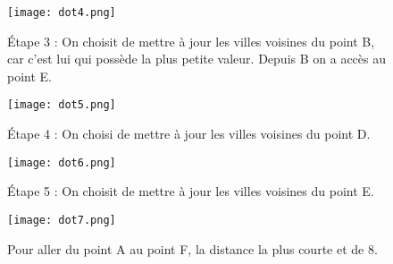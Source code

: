 \begin{figure}[h]
\begin{center}
    \texttt{[image: dot4.png]} 
    \caption{Étape 3 : On choisit de mettre à jour les villes voisines du point B, car c'est lui qui possède la plus petite valeur. Depuis B on a accès au point E.}
\end{center}
\end{figure}

\begin{figure}[h]
\begin{center}
    \texttt{[image: dot5.png]} 
    \caption{Étape 4 : On choisi de mettre à jour les villes voisines du point D.}
\end{center}
\end{figure}

\begin{figure}[h]
\begin{center}
    \texttt{[image: dot6.png]} 
    \caption{Étape 5 : On choisit de mettre à jour les villes voisines du point E.}
\end{center}
\end{figure}


\begin{figure}[h]
\begin{center}
    \texttt{[image: dot7.png]} 
    \caption{Pour aller du point A au point F, la distance la plus courte et de 8.}
\end{center}
\end{figure}
